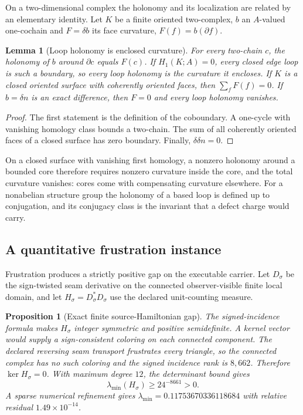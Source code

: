 \documentclass[11pt]{article}
\newtheorem{proposition}[theorem]{Proposition}
\newtheorem{lemma}[theorem]{Lemma}
\begin{document}
On a two-dimensional complex the holonomy and its localization are related
by an elementary identity. Let \(K\) be a finite oriented two-complex, \(b\)
an \(A\)-valued one-cochain and \(F=\delta b\) its face curvature,
\(F(f)=b(\partial f)\).

\begin{lemma}[Loop holonomy is enclosed curvature]
\label{lem:enclosed-curvature}
For every two-chain \(c\), the holonomy of \(b\) around \(\partial c\)
equals \(F(c)\). If \(H_1(K;A)=0\), every closed edge loop is such a
boundary, so every loop holonomy is the curvature it encloses. If \(K\) is a
closed oriented surface with coherently oriented faces, then
\(\sum_fF(f)=0\). If \(b=\delta n\) is an exact difference, then \(F=0\) and
every loop holonomy vanishes.
\end{lemma}

\begin{proof}
The first statement is the definition of the coboundary. A one-cycle with
vanishing homology class bounds a two-chain. The sum of all coherently
oriented faces of a closed surface has zero boundary. Finally,
\(\delta\delta n=0\).
\end{proof}

On a closed surface with vanishing first homology, a nonzero holonomy around
a bounded core therefore requires nonzero curvature inside the core, and the
total curvature vanishes: cores come with compensating curvature elsewhere.
For a nonabelian structure group the holonomy of a based loop is defined up
to conjugation, and its conjugacy class is the invariant that a defect
charge would carry.

\subsection{A quantitative frustration instance}

Frustration produces a strictly positive gap on the executable carrier. Let
\(D_\sigma\) be the sign-twisted seam derivative on the connected
observer-visible finite local domain, and let
\(H_\sigma=D_\sigma^\ast D_\sigma\) use the declared unit-counting measure.

\begin{proposition}[Exact finite source-Hamiltonian gap]
\label{prop:finite-source-hamiltonian-gap}
The signed-incidence formula makes \(H_\sigma\) integer symmetric and
positive semidefinite. A kernel vector would supply a sign-consistent
coloring on each connected component. The declared reversing seam transport
frustrates every triangle, so the connected complex has no such coloring and
the signed incidence rank is \(8{,}662\). Therefore \(\ker H_\sigma=0\). With
maximum degree \(12\), the determinant bound gives
\[
  \lambda_{\min}(H_\sigma)\geq 24^{-8661}>0 .
\]
A sparse numerical refinement gives
\(\lambda_{\min}=0.11753670336118684\) with relative residual
\(1.49\times10^{-14}\).
\end{proposition}
\end{document}
